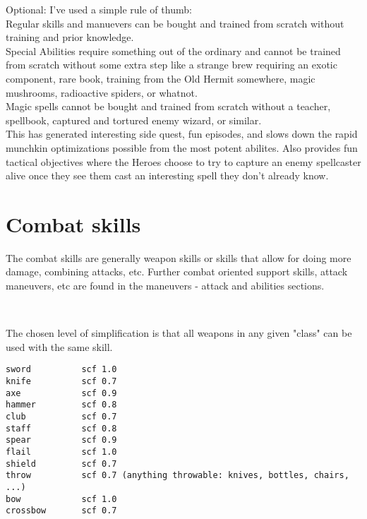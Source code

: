 Optional: I've used a simple rule of thumb: \\
Regular skills and manuevers can be bought and trained from scratch without training and prior knowledge. \\
Special Abilities require something out of the ordinary and cannot be trained from scratch without some extra step like a strange brew requiring an exotic component, rare book, training from the Old Hermit somewhere, magic mushrooms, radioactive spiders, or whatnot.\\
Magic spells cannot be bought and trained from scratch without a teacher, spellbook, captured and tortured enemy wizard, or similar.\\
This has generated interesting side quest, fun episodes, and slows down the rapid munchkin optimizations possible from the most potent abilites. Also provides fun tactical objectives where the Heroes choose to try to capture an enemy spellcaster alive once they see them cast an interesting spell they don't already know.

%










\section*{Combat skills}

The combat skills are generally weapon skills or skills that allow for doing more damage, combining attacks, etc. Further combat oriented support skills, attack maneuvers, etc are found in the maneuvers - attack and abilities sections.

\

\openskillslist

\begin{samepage}
 The chosen level of simplification is that all weapons in any given "class" can be used with the same skill.

\begin{verbatim}
sword          scf 1.0
knife          scf 0.7
axe            scf 0.9
hammer         scf 0.8
club           scf 0.7
staff          scf 0.8
spear          scf 0.9
flail          scf 1.0
shield         scf 0.7
throw          scf 0.7 (anything throwable: knives, bottles, chairs, ...)
bow            scf 1.0
crossbow       scf 0.7
\end{verbatim}
\end{samepage}


